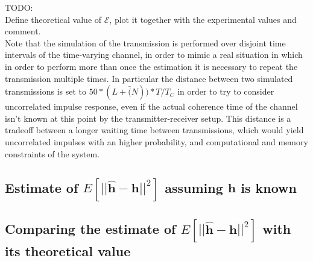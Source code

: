 \documentclass[10pt]{article}
\begin{document}
TODO:\\
Define theoretical value of $\mathcal{E}$, plot it together with the experimental values and comment.\\
Note that the simulation of the transmission is performed over disjoint time intervals of the time-varying channel, in order to mimic a real situation in which in order to perform more than once the estimation it is necessary to repeat the transmission multiple times. In particular the distance between two simulated transmissions is set to $50*(L+\bar(N))*T/T_C$ in order to try to consider uncorrelated impulse response, even if the actual coherence time of the channel isn't known at this point by the transmitter-receiver setup. This distance is a tradeoff between a longer waiting time between transmissions, which would yield uncorrelated impulses with an higher probability, and computational and memory constraints of the system. %


\subsection*{Estimate of $E[||\mathbf{\hat{h}}-\mathbf{h}||^2]$ assuming $\mathbf{h}$ is known}



\subsection*{Comparing the estimate of $E[||\mathbf{\hat{h}}-\mathbf{h}||^2]$ with its theoretical value}
\end{document}

